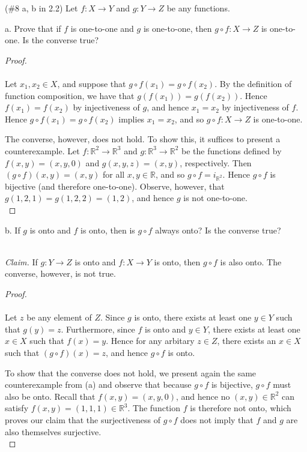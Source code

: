 (\#8 a, b in 2.2) Let $f:X\to Y$ and $g:Y\to Z$ be any functions.

a. Prove that if $f$ is one-to-one and $g$ is one-to-one, then $g\circ f:X\to Z$
 is one-to-one. Is the converse true?\ \\

\begin{proof}\ \\\\
    Let $x_1, x_2 \in X$, and suppose that $g \circ f(x_1) = g \circ f(x_2)$.
    By the definition of function composition, we have that
    $g\left(f(x_1)\right) = g\left(f(x_2)\right)$. Hence $f(x_1) = f(x_2)$
    by injectiveness of $g$, and hence $x_1 = x_2$ by injectiveness of $f$. 
    Hence $g \circ f(x_1) = g \circ f(x_2)$ implies $x_1 = x_2$, and so
    $g\circ f:X\to Z$ is one-to-one.
    
    The converse, however, does not hold. To
    show this, it suffices to present a counterexample. Let
    $f:\mathbb{R}^2 \to \mathbb{R}^3$ and $g:\mathbb{R}^3 \to \mathbb{R}^2$ be
    the functions defined by $f(x, y) = (x, y, 0)$ and $g(x, y, z) = (x, y)$,
    respectively. Then $(g \circ f)(x, y) = (x, y)$ for all 
    $x,y \in \mathbb{R}$, and so $g \circ f = i_{\mathbb{R}^2}$. Hence
    $g \circ f$ is bijective (and therefore one-to-one). Observe, however, that
    $g(1, 2, 1) = g(1, 2, 2) = (1, 2)$, and hence $g$ is not one-to-one.
    \ \\ 
\end{proof}

\pagebreak
b. If $g$ is onto and $f$ is onto, then is $g\circ f$ always onto? Is the
   converse true?

\ \\
\emph{Claim.} If $g:Y \to Z$ is onto and $f:X \to Y$ is onto, then $g\circ f$ is
              also onto. The converse, however, is not true.

\begin{proof}\ \\\\
    Let $z$ be any element of $Z$. Since $g$ is onto, there exists at least one
    $y \in Y$ such that $g(y) = z$. Furthermore, since $f$ is onto and 
    $y \in Y$, there exists at least one $x \in X$ such that $f(x) = y$. Hence
    for any arbitary $z \in Z$, there exists an $x \in X$ such that
    $(g \circ f)(x) = z$, and hence $g \circ f$ is onto.

    To show that the converse does not hold, we present again the same
    counterexample from (a) and observe that because $g \circ f$ is bijective,
    $g \circ f$ must also be onto. Recall that $f(x, y) = (x, y, 0)$, and hence
    no $(x, y) \in \mathbb{R}^2$ can satisfy 
    $f(x, y) = (1, 1, 1) \in \mathbb{R}^3$. The function $f$ is therefore not
    onto, which proves our claim that the surjectiveness of $g \circ f$ does not
    imply that $f$ and $g$ are also themselves surjective.
    \ \\
\end{proof}